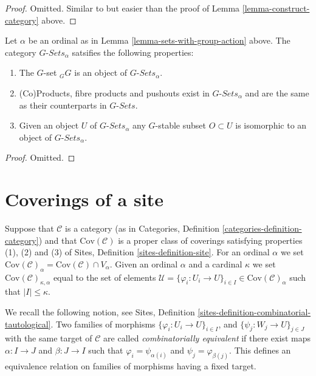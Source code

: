 \begin{proof}
Omitted. Similar to but easier than the proof of
Lemma \ref{lemma-construct-category} above.
\end{proof}

\begin{lemma}
\label{lemma-what-is-in-it-G-sets}
Let $\alpha$ be an ordinal as in Lemma \ref{lemma-sets-with-group-action}
above. The category $G\textit{-Sets}_\alpha$ satsifies the following
properties:
\begin{enumerate}
\item The $G$-set ${}_GG$ is an object of $G\textit{-Sets}_\alpha$.
\item (Co)Products, fibre products and pushouts
exist in $G\textit{-Sets}_\alpha$
and are the same as their counterparts in $G\textit{-Sets}$.
\item Given an object $U$ of $G\textit{-Sets}_\alpha$
any $G$-stable subset $O \subset U$  is isomorphic to an object
of $G\textit{-Sets}_\alpha$.
\end{enumerate}
\end{lemma}

\begin{proof}
Omitted.
\end{proof}

\section{Coverings of a site}
\label{section-coverings-site}

\noindent
Suppose that $\mathcal{C}$ is a category (as in
Categories, Definition \ref{categories-definition-category}) and
that $\text{Cov}(\mathcal{C})$ is a proper class of coverings
satisfying properties (1), (2) and (3) of Sites,
Definition \ref{sites-definition-site}.
For an ordinal $\alpha$ we set
$\text{Cov}(\mathcal{C})_\alpha = \text{Cov}(\mathcal{C}) \cap V_\alpha$.
Given an ordinal $\alpha$ and a cardinal $\kappa$ we set
$\text{Cov}(\mathcal{C})_{\kappa, \alpha}$ equal to the set
of elements
$\mathcal{U} =
\{\varphi_i : U_i \to U\}_{i\in I} \in \text{Cov}(\mathcal{C})_\alpha$
such that $|I| \leq \kappa$.

\medskip\noindent
We recall the following notion, see Sites, Definition
\ref{sites-definition-combinatorial-tautological}.
Two families of morphisms $\{\varphi_i : U_i \to U\}_{i\in I}$, and
$\{\psi_j : W_j \to U\}_{j\in J}$ with the same target of $\mathcal{C}$ are
called {\it combinatorially equivalent} if there exist maps
$\alpha : I \to J$ and $\beta : J\to I$ such that
$\varphi_i = \psi_{\alpha(i)}$ and $\psi_j = \varphi_{\beta(j)}$.
This defines an equivalence relation on families of morphisms
having a fixed target.

